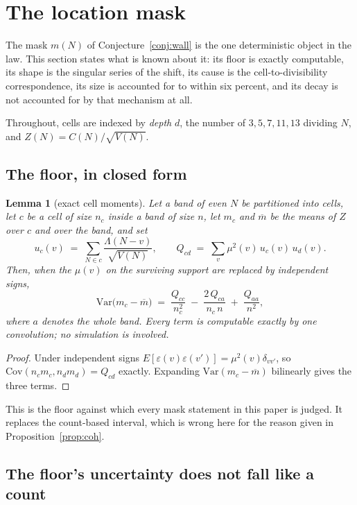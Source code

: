 \documentclass[11pt,a4paper]{article}
\theoremstyle{plain}
\newtheorem{lemma}[theorem]{Lemma}
\theoremstyle{definition}
\begin{document}
\section{The location mask}\label{sec:floor}

The mask $m(N)$ of Conjecture~\ref{conj:wall} is the one deterministic
object in the law. This section states what is known about it: its
floor is exactly computable, its shape is the singular series of the
shift, its cause is the cell-to-divisibility correspondence, its size
is accounted for to within six percent, and its decay is not accounted
for by that mechanism at all.

Throughout, cells are indexed by \emph{depth} $d$, the number of
$3,5,7,11,13$ dividing $N$, and $Z(N)=C(N)/\sqrt{V(N)}$.

\subsection{The floor, in closed form}

\begin{lemma}[exact cell moments]\label{lem:cellmom}
Let a band of even $N$ be partitioned into cells, let $c$ be a cell of
size $n_c$ inside a band of size $n$, let $m_c$ and $\overline m$ be
the means of $Z$ over $c$ and over the band, and set
\[
  u_c(v) \;=\; \sum_{N\in c}\frac{\Lambda(N-v)}{\sqrt{V(N)}},
  \qquad
  Q_{cd} \;=\; \sum_v \mu^2(v)\,u_c(v)\,u_d(v).
\]
Then, when the $\mu(v)$ on the surviving support are replaced by
independent signs,
\[
  \mathrm{Var}\bigl(m_c-\overline m\bigr)
  \;=\; \frac{Q_{cc}}{n_c^{2}}
  \;-\; \frac{2\,Q_{ca}}{n_c\,n}
  \;+\; \frac{Q_{aa}}{n^{2}},
\]
where $a$ denotes the whole band. Every term is computable exactly by
one convolution; no simulation is involved.
\end{lemma}

\begin{proof}
Under independent signs $E[\varepsilon(v)\varepsilon(v')]
=\mu^2(v)\delta_{vv'}$, so
$\mathrm{Cov}(n_c m_c, n_d m_d) = Q_{cd}$ exactly. Expanding
$\mathrm{Var}(m_c-\overline m)$ bilinearly gives the three terms.
\end{proof}

This is the floor against which every mask statement in this paper is
judged. It replaces the count-based interval, which is wrong here for
the reason given in Proposition~\ref{prop:coh}.

\subsection{The floor's uncertainty does not fall like a count}
\end{document}
